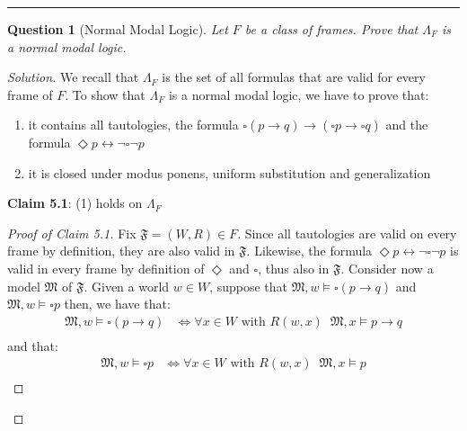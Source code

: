 \documentclass[12pt,a4paper]{report}
\newtheorem{question}{Question}
\theoremstyle{definition}
\newcommand{\model}[1]{\mathfrak{#1}}           %
\begin{document}
    \quad

    \hrule

    \quad

    \newpage

    \begin{question}[Normal Modal Logic]
        Let $F$ be a class of frames. Prove that $\Lambda_{F}$ is a normal modal logic.
    \end{question}

    \begin{proof}[Solution]
        We recall that $\Lambda_{F}$ is the set of all formulas that are valid for every frame of $F$. To show that $\Lambda_{F}$ is a normal modal logic, we have to prove that:
        \begin{enumerate}[label={(\arabic*)}]
            \item it contains all tautologies, the formula $\square(p \to q) \to (\square p \to \square q)$ and the formula $\Diamond p \leftrightarrow \lnot \square \lnot p$
            \item it is closed under modus ponens, uniform substitution and generalization 
        \end{enumerate}

        \textbf{Claim 5.1}: (1) holds on $\Lambda_{F}$
        
        \begin{proof}[Proof of Claim 5.1]
            
            Fix $\model{F} = (W,R) \in F$. Since all tautologies are valid on every frame by definition, they are also valid in $\model{F}$. Likewise, the formula $\Diamond p \leftrightarrow \lnot \square \lnot p$ is valid in every frame by definition of $\Diamond$ and $\square$, thus also in $\model{F}$. Consider now a model $\model{M}$ of $\model{F}$. Given a world $w \in W$, suppose that $\model{M}, w \models \square(p \to q)$ and $\model{M}, w \models \square p$ then, we have that:
            \[\begin{split}
                \model{M}, w \models \square(p \to q) & \iff \forall x \in W \text{ with } R(w,x) \;\; \model{M}, x \models p \to q \\
            \end{split}\]
            and that:
            \[\begin{split}
                \model{M}, w \models \square p & \iff \forall x \in W \text{ with } R(w,x) \;\; \model{M}, x \models p \\
            \end{split}\]


\end{proof}
\end{proof}
\end{document}
